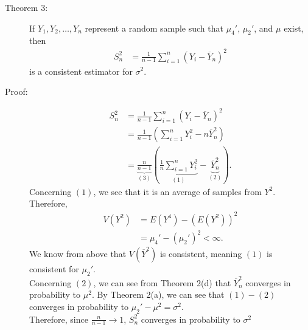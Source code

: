 \documentclass[10pt]{extarticle}
\begin{document}
  \begin{description}
    \item[Theorem 3:] If $Y_1,Y_2,\dots,Y_n$ represent a random sample such that $\mu_4'$, $\mu_2'$, and $\mu$ exist, then
      \begin{align*}
        S_n^2 &= \frac{1}{n-1}\sum_{i=1}^{n}(Y_i - \overline{Y}_n)^2
      \end{align*}
      is a consistent estimator for $\sigma^2$.
    \item[Proof:]
      \begin{align*}
        S_n^2 &= \frac{1}{n-1}\sum_{i=1}^{n}(Y_i - \overline{Y}_n)^2\\
              &= \frac{1}{n-1} \left(\sum_{i=1}^{n}Y_i^2 - n\overline{Y}_n^2\right)\\
              &= \underbrace{\frac{n}{n-1}}_{(3)}\left(\underbrace{\frac{1}{n}\sum_{i=1}^{n}Y_i^2}_{(1)} - \underbrace{\overline{Y}_n^2}_{(2)}\right).
      \end{align*}
      Concerning $(1)$, we see that it is an average of samples from $Y^2$. Therefore,
      \begin{align*}
        V(Y^2) &= E(Y^4) - (E(Y^2))^2\\
               &= \mu_4' - (\mu_2')^2 < \infty.
      \end{align*}
      We know from above that $V(\overline{Y}^2)$ is consistent, meaning $(1)$ is consistent for $\mu_2'$.\\

      Concerning $(2)$, we can see from Theorem 2(d) that $\overline{Y}_n^2$ converges in probability to $\mu^2$. By Theorem 2(a), we can see that $(1)-(2)$ converges in probability to $\mu_2'-\mu^2 = \sigma^2$.\\

      Therefore, since $\frac{n}{n-1}\rightarrow 1$, $S_n^2$ converges in probability to $\sigma^2$
  \end{description}
\end{document}
